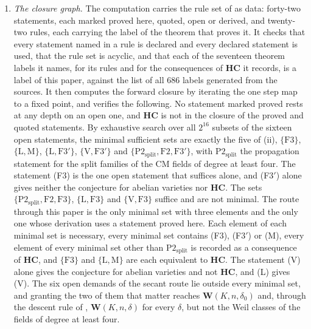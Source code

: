 \begin{enumerate}[label=\textup{(\Roman*)},leftmargin=*]
\item \emph{The closure graph.} The computation carries the rule set of
   as data: forty-two statements, each marked proved here,
  quoted, open or derived, and twenty-two rules, each carrying the label of
  the theorem that proves it. It checks that every statement named in a rule
  is declared and every declared statement is used, that the rule set is
  acyclic, and that each of the seventeen theorem labels it names, for its
  rules and for the consequences of $\mathbf{HC}$ it records, is a label of
  this paper, against the list of all $686$ labels generated from the
  sources. It then computes the forward closure by iterating the one step map
  to a fixed point, and verifies the following. No statement marked proved
  rests at any depth on an open one, and $\mathbf{HC}$ is not in the closure
  of the proved and quoted statements. By exhaustive search over all
  $2^{16}$ subsets of the sixteen open statements, the minimal sufficient
  sets are exactly the five of (ii), $\{\mathrm{F3}\}$,
  $\{\mathrm{L},\mathrm{M}\}$, $\{\mathrm{L},\mathrm{F3}'\}$,
  $\{\mathrm{V},\mathrm{F3}'\}$ and
  $\{\mathrm{P2}_{\mathrm{split}},\mathrm{F2},\mathrm{F3}'\}$, with
  $\mathrm{P2}_{\mathrm{split}}$ the propagation statement for the split
  families of the CM fields of degree at least four. The statement (F3) is
  the one open statement that suffices alone, and \textup{(F3$'$)} alone
  gives neither the conjecture for abelian varieties nor $\mathbf{HC}$. The
  sets
  $\{\mathrm{P2}_{\mathrm{split}},\mathrm{F2},\mathrm{F3}\}$,
  $\{\mathrm{L},\mathrm{F3}\}$ and $\{\mathrm{V},\mathrm{F3}\}$ suffice and
  are not minimal. The route through this paper is the only minimal set with
  three elements and the only one whose derivation uses a statement proved
  here. Each element of each minimal set is necessary, every minimal set
  contains (F3), \textup{(F3$'$)} or \textup{(M)}, every element of every
  minimal set other than $\mathrm{P2}_{\mathrm{split}}$ is recorded as a
  consequence of $\mathbf{HC}$, and $\{\mathrm{F3}\}$ and
  $\{\mathrm{L},\mathrm{M}\}$ are each equivalent to $\mathbf{HC}$.
  The statement \textup{(V)} alone gives the conjecture for abelian varieties
  and not $\mathbf{HC}$, and \textup{(L)} gives \textup{(V)}. The six open
  demands of the secant route lie outside every minimal set, and granting the
  two of
  them that matter reaches $\mathbf{W}(K,n,\delta_{0})$ and, through the
  descent rule of , $\mathbf{W}(K,n,\delta)$ for every
  $\delta$, but not the Weil classes of the fields of degree at least four.

\end{enumerate}

